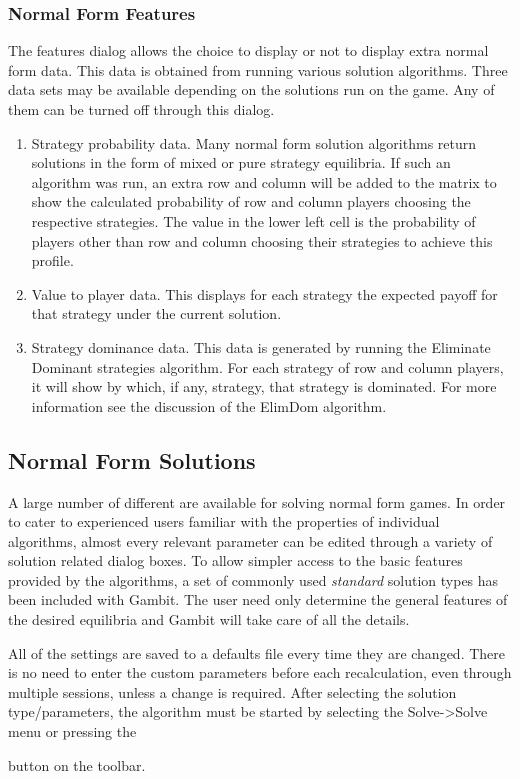 \subsubsection{Normal Form Features}\label{nffeaturessec}
The features dialog allows the choice to display or not to display extra
normal form data.  This data is obtained from running various solution
algorithms.  Three data sets may be available depending on the solutions
run on the game.  Any of them can be turned off through this dialog.
\begin{enumerate}
\item Strategy probability data.  Many normal form solution
algorithms return solutions in the form of mixed or pure strategy
equilibria.  If such an algorithm was run, an extra row and column will be
added to the matrix to show the calculated probability of row and column
players choosing the respective strategies.  The value in the lower left
cell is the probability of players other than row and column choosing
their strategies to achieve this profile.
\item Value to player data.  This displays for each strategy the expected 
payoff for that strategy under the current solution.  
\item Strategy dominance data.  This data is generated by running
the Eliminate Dominant strategies algorithm.  For each strategy of row and
column players, it will show by which, if any, strategy, that strategy is
dominated.  For more information see the discussion of the ElimDom
algorithm.
\end{enumerate}

\subsection{Normal Form Solutions}\label{NormalFormSolutions}
A large number of different  are 
available for solving normal form
games.  In order to cater to experienced users familiar with the 
properties of individual algorithms, almost every relevant parameter can
be edited through a variety of solution related dialog boxes.  To allow 
simpler access to the basic features provided by the algorithms, a set of
commonly used {\em standard} solution types has been included with Gambit.
The user need only determine the general features of the desired equilibria
and Gambit will take care of all the details.

All of
the settings are saved to a defaults file every time they are changed. There
is no need to enter the custom parameters before each recalculation, even
through multiple sessions, unless a change is required.
After selecting the solution type/parameters, the algorithm must be started
by selecting the Solve->Solve menu or pressing the 
\begin{figure}
\end{figure}
 button on the toolbar.

